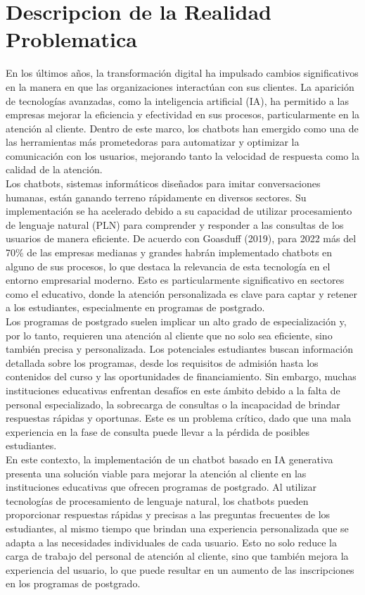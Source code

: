 \documentclass[10pt,a4paper]{article}
\begin{document}
	
	\section{Descripcion de la Realidad Problematica}
En los últimos años, la transformación digital ha impulsado cambios significativos en la manera en que las organizaciones interactúan con sus clientes. La aparición de tecnologías avanzadas, como la inteligencia artificial (IA), ha permitido a las empresas mejorar la eficiencia y efectividad en sus procesos, particularmente en la atención al cliente. Dentro de este marco, los chatbots han emergido como una de las herramientas más prometedoras para automatizar y optimizar la comunicación con los usuarios, mejorando tanto la velocidad de respuesta como la calidad de la atención.\\

Los chatbots, sistemas informáticos diseñados para imitar conversaciones humanas, están ganando terreno rápidamente en diversos sectores. Su implementación se ha acelerado debido a su capacidad de utilizar procesamiento de lenguaje natural (PLN) para comprender y responder a las consultas de los usuarios de manera eficiente. De acuerdo con Goasduff (2019), para 2022 más del 70\% de las empresas medianas y grandes habrán implementado chatbots en alguno de sus procesos, lo que destaca la relevancia de esta tecnología en el entorno empresarial moderno. Esto es particularmente significativo en sectores como el educativo, donde la atención personalizada es clave para captar y retener a los estudiantes, especialmente en programas de postgrado.\\

Los programas de postgrado suelen implicar un alto grado de especialización y, por lo tanto, requieren una atención al cliente que no solo sea eficiente, sino también precisa y personalizada. Los potenciales estudiantes buscan información detallada sobre los programas, desde los requisitos de admisión hasta los contenidos del curso y las oportunidades de financiamiento. Sin embargo, muchas instituciones educativas enfrentan desafíos en este ámbito debido a la falta de personal especializado, la sobrecarga de consultas o la incapacidad de brindar respuestas rápidas y oportunas. Este es un problema crítico, dado que una mala experiencia en la fase de consulta puede llevar a la pérdida de posibles estudiantes.\\

En este contexto, la implementación de un chatbot basado en IA generativa presenta una solución viable para mejorar la atención al cliente en las instituciones educativas que ofrecen programas de postgrado. Al utilizar tecnologías de procesamiento de lenguaje natural, los chatbots pueden proporcionar respuestas rápidas y precisas a las preguntas frecuentes de los estudiantes, al mismo tiempo que brindan una experiencia personalizada que se adapta a las necesidades individuales de cada usuario. Esto no solo reduce la carga de trabajo del personal de atención al cliente, sino que también mejora la experiencia del usuario, lo que puede resultar en un aumento de las inscripciones en los programas de postgrado.\\
\end{document}
